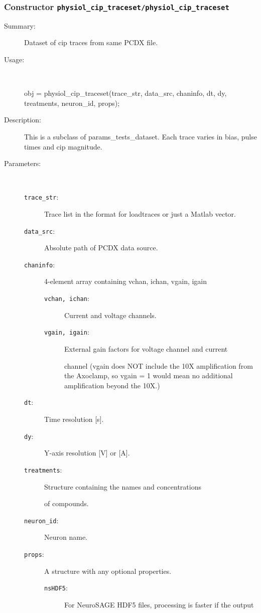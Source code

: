 \subsubsection[Constructor \texttt{physiol\_cip\_traceset}]{Constructor \texttt{physiol\_cip\_traceset/physiol\_cip\_traceset}}%
%
\label{ref_physiol_cip_traceset__physiol_cip_traceset}%
\hypertarget{ref_physiol_cip_traceset__physiol_cip_traceset}{}%
\begin{description}
\item[Summary:]Dataset of cip traces from same PCDX file.
%
\item[Usage:]~%
\begin{lyxcode}%
obj = physiol\_cip\_traceset(trace\_str, data\_src, chaninfo, dt, dy, treatments, neuron\_id, props);
%
\end{lyxcode}%
%
\item[Description:]%
This is a subclass of params\_tests\_dataset. Each trace varies in bias, 
 pulse times and cip magnitude.
\item[Parameters:]~
\begin{description}%
\item[\texttt{trace\_str}:]
 Trace list in the format for loadtraces or just a Matlab vector.
\item[\texttt{data\_src}:]
 Absolute path of PCDX data source.
\item[\texttt{chaninfo}:]
 4-element array containing vchan, ichan, vgain, igain
\begin{description}%
\item[\texttt{vchan, ichan}:]
 Current and voltage channels.
\item[\texttt{vgain, igain}:]
 External gain factors for voltage channel and current 

channel
(vgain does NOT include the 10X amplification from the Axoclamp,
so vgain = 1 would mean no additional amplification beyond the 10X.)
\end{description}%
\item[\texttt{dt}:]
 Time resolution [s].
\item[\texttt{dy}:]
 Y-axis resolution [V] or [A].
\item[\texttt{treatments}:]
 Structure containing the names and concentrations

of compounds.
\item[\texttt{neuron\_id}:]
 Neuron name.
\item[\texttt{props}:]
 A structure with any optional properties.
\begin{description}%
\item[\texttt{nsHDF5}:]
 For NeuroSAGE HDF5 files, processing is faster if the output


\end{description}
\end{description}
\end{description}
